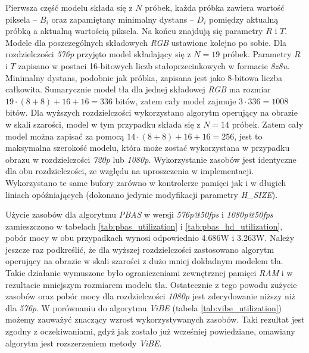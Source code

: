 Pierwsza część modelu składa się z $N$ próbek, każda próbka zawiera wartość piksela -- $B_i$ oraz zapamiętany minimalny dystans -- $D_i$ pomiędzy aktualną próbką a aktualną wartością piksela. 
Na końcu znajdują się parametry $R$ i $T$. 
Modele dla poszczególnych składowych \textit{RGB} ustawione kolejno po sobie. 
Dla rozdzielczości \textit{576p} przyjęto model składający się z $N=19$ próbek. 
Parametry $R$ i $T$ zapisano w postaci 16-bitowych liczb stałoprzecinkowych w formacie \textit{8z8u}. 
Minimalny dystans, podobnie jak próbka, zapisana jest jako 8-bitowa liczba całkowita. 
Sumarycznie model tła dla jednej składowej \textit{RGB} ma rozmiar $19 \cdot (8+8) + 16 + 16 = 336$ bitów, zatem cały model zajmuje $3 \cdot 336 = 1008$ bitów. 
Dla wyższych rozdzielczości wykorzystano algorytm operujący na obrazie w skali szarości, model w tym przypadku składa się z $N=14$ próbek. 
Zatem cały model można zapisać za pomocą $14 \cdot (8+8) + 16 + 16 = 256$, jest to maksymalna szerokość modelu, która może zostać wykorzystana w przypadku obrazu w rozdzielczości \textit{720p} lub \textit{1080p}. Wykorzystanie zasobów jest identyczne dla obu rozdzielczości, ze względu na uproszczenia w implementacji. Wykorzystano te same bufory zarówno w kontrolerze pamięci jak i w długich liniach opóźniających (dokonano jedynie modyfikacji parametry \textit{H\_SIZE}).

Użycie zasobów dla algorytmu \textit{PBAS} w wersji \textit{576p@50fps} i \textit{1080p@50fps} zamieszczono w tabelach \ref{tab:pbas_utilization} i \ref{tab:pbas_hd_utilization}, pobór mocy w obu przypadkach wynosi odpowiednio \num{4.686}W i \num{3.263}W. 
Należy jeszcze raz podkreślić, że dla wyższej rozdzielczości zastosowano algorytm operujący na obrazie w skali szarości z dużo mniej dokładnym modelem tła. 
Takie działanie wymuszone było ograniczeniami zewnętrznej pamięci \textit{RAM} i w rezultacie mniejszym rozmiarem modelu tła. 
Ostatecznie z tego powodu zużycie zasobów oraz pobór mocy dla rozdzielczości \textit{1080p} jest zdecydowanie niższy niż dla \textit{576p}. 
W porównaniu do algorytmu \textit{ViBE} (tabela \ref{tab:vibe_utilization}) możemy zauważyć znaczący wzrost wykorzystywanych zasobów. 
Taki rezultat jest zgodny z oczekiwaniami, gdyż jak zostało już wcześniej powiedziane, omawiany algorytm jest rozszerzeniem metody \textit{ViBE}.


